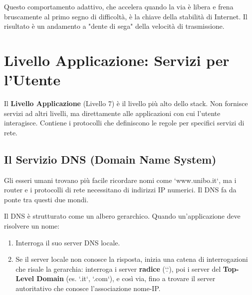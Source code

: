 Questo comportamento adattivo, che accelera quando la via è libera e frena bruscamente al primo segno di difficoltà, è la chiave della stabilità di Internet. Il risultato è un andamento a "dente di sega" della velocità di trasmissione.


\section{Livello Applicazione: Servizi per l'Utente}
Il \textbf{Livello Applicazione} (Livello 7) è il livello più alto dello stack. Non fornisce servizi ad altri livelli, ma direttamente alle applicazioni con cui l'utente interagisce. Contiene i protocolli che definiscono le regole per specifici servizi di rete.

\subsection{Il Servizio DNS (Domain Name System)}
Gli esseri umani trovano più facile ricordare nomi come `www.unibo.it`, ma i router e i protocolli di rete necessitano di indirizzi IP numerici. Il DNS fa da ponte tra questi due mondi.


Il DNS è strutturato come un albero gerarchico. Quando un'applicazione deve risolvere un nome:
\begin{enumerate}
    \item Interroga il suo server DNS locale.
    \item Se il server locale non conosce la risposta, inizia una catena di interrogazioni che risale la gerarchia: interroga i server \textbf{radice} (`.`), poi i server del \textbf{Top-Level Domain} (es. `.it`, `.com`), e così via, fino a trovare il server autoritativo che conosce l'associazione nome-IP.
\end{enumerate}


